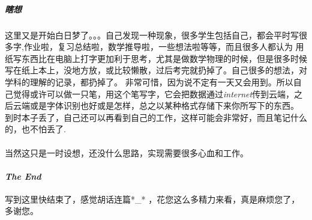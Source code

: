 \documentclass[10pt,a4paper]{article}
\begin{document}
\subparagraph{瞎想}
这里又是开始白日梦了。。。自己发现一种现象，很多学生包括自己，都会平时写很多字,作业啦，复习总结啦，数学推导啦，一些想法啦等等，而且很多人都认为
用纸写东西比在电脑上打字更加利于思考，尤其是做数学物理的时候，但是很多时候写在纸上本上，没地方放，或比较懒散，过后考完就扔掉了。自己很多的想法，对学科的理解的记录，都扔掉了。
非常可惜，因为说不定有一天又会用到。所以自己觉得或许可以做一只笔，用这个笔写字，它会把数据通过\emph{internet}传到云端，之后云端或是字体识别也好或是怎样，总之以某种格式存储下来你所写下的东西。
到时本子丢了，自己还可以再看到自己的工作，这样可能会非常好，而且笔记什么的，也不怕丢了. \\\\
当然这只是一时设想，还没什么思路，实现需要很多心血和工作。



\paragraph{\emph{The End}}
写到这里快结束了，感觉胡话连篇*\_* ，花您这么多精力来看，真是麻烦您了，多谢您。
\end{document}
